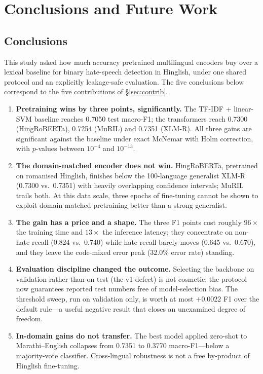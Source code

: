 \chapter{Conclusions and Future Work}
\label{ch:conclusion}

\section{Conclusions}
\label{sec:conclusions}

This study asked how much accuracy pretrained multilingual encoders buy over a
lexical baseline for binary hate-speech detection in Hinglish, under one shared
protocol and an explicitly leakage-safe evaluation. The five conclusions below
correspond to the five contributions of \S\ref{sec:contrib}.

\begin{enumerate}
\item \textbf{Pretraining wins by three points, significantly.} The TF-IDF +
linear-SVM baseline reaches 0.7050 test macro-F1; the transformers reach 0.7300
(HingRoBERTa), 0.7254 (MuRIL) and 0.7351 (XLM-R). All three gains are significant
against the baseline under exact McNemar with Holm correction, with $p$-values
between $10^{-4}$ and $10^{-13}$.
\item \textbf{The domain-matched encoder does not win.} HingRoBERTa, pretrained on
romanised Hinglish, finishes below the 100-language generalist XLM-R
(0.7300 vs.\ 0.7351) with heavily overlapping confidence intervals; MuRIL trails
both. At this data scale, three epochs of fine-tuning cannot be shown to exploit
domain-matched pretraining better than a strong generalist.
\item \textbf{The gain has a price and a shape.} The three F1 points cost roughly
$96\times$ the training time and $13\times$ the inference latency; they
concentrate on non-hate recall (0.824 vs.\ 0.740) while hate recall barely moves
(0.645 vs.\ 0.670), and they leave the code-mixed error peak (32.0\% error rate)
standing.
\item \textbf{Evaluation discipline changed the outcome.} Selecting the backbone
on validation rather than on test (the v1 defect) is not cosmetic: the protocol
now guarantees reported test numbers free of model-selection bias. The threshold
sweep, run on validation only, is worth at most $+0.0022$ F1 over the default
rule---a useful negative result that closes an unexamined degree of freedom.
\item \textbf{In-domain gains do not transfer.} The best model applied zero-shot
to Marathi--English collapses from 0.7351 to 0.3770 macro-F1---below a
majority-vote classifier. Cross-lingual robustness is not a free by-product of
Hinglish fine-tuning.
\end{enumerate}

